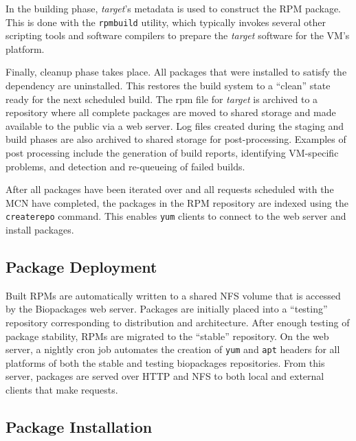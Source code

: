 In the building phase, \textit{target}'s metadata is used to construct the RPM package.  This is
done with the \texttt{rpmbuild} utility, which typically invokes several other scripting tools and
software compilers to prepare the \textit{target} software for the VM's platform.

Finally, cleanup phase takes place.  All packages that were installed to satisfy the dependency are
uninstalled.  This restores the build system to a ``clean'' state ready for the next scheduled build.
The rpm file for \textit{target} is archived to a repository where all complete packages are moved to shared storage and
made available to the public via a web server.  Log files created during the staging and build phases
are also archived to shared storage for post-processing.  Examples of post processing include the generation of build
reports, identifying VM-specific problems, and detection and re-queueing of failed builds.

After all packages have been iterated over and all requests scheduled with the MCN have completed,
the packages in the RPM repository are indexed using the \texttt{createrepo} command.  This enables
\texttt{yum} clients to connect to the web server and install packages.

\subsection{Package Deployment}

Built RPMs are automatically written to a shared NFS volume that is
accessed by the Biopackages web server. Packages are initially placed into a
``testing'' repository corresponding to distribution and architecture. After
enough testing of package stability, RPMs are migrated to the ``stable''
repository. On the web server, a nightly cron job automates the creation of
\texttt{yum} and \texttt{apt} headers for all platforms of both the stable and testing
biopackages repositories. From this server, packages are served over HTTP and
NFS to both local and external clients that make requests.

\subsection{Package Installation}

